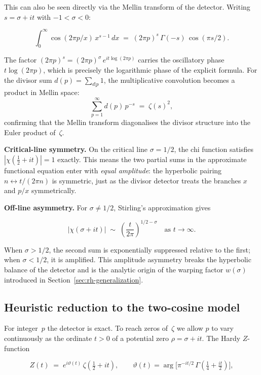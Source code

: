 \documentclass[12pt,a4paper]{article}
\begin{document}
This can also be seen directly via the Mellin transform of the detector. Writing $s = \sigma + it$ with $-1 < \sigma < 0$:

\begin{mathblock}
\[
\int_0^{\infty} \cos(2\pi p/x)\,x^{s-1}\,dx \;=\; (2\pi p)^{s}\,\Gamma(-s)\,\cos(\pi s/2).
\]
\end{mathblock}

\noindent The factor $(2\pi p)^s = (2\pi p)^{\sigma}\,e^{it\log(2\pi p)}$ carries the oscillatory phase $t\log(2\pi p)$, which is precisely the logarithmic phase of the explicit formula. For the divisor sum $d(p) = \sum_{d|p}1$, the multiplicative convolution becomes a product in Mellin space:
\[
\sum_{p=1}^{\infty} d(p)\,p^{-s} \;=\; \zeta(s)^{2},
\]
confirming that the Mellin transform diagonalises the divisor structure into the Euler product of~$\zeta$.

\textbf{Critical-line symmetry.} On the critical line $\sigma = 1/2$, the chi function satisfies $|\chi(\tfrac12+it)|=1$ exactly. This means the two partial sums in the approximate functional equation enter with \emph{equal amplitude}: the hyperbolic pairing $n \leftrightarrow t/(2\pi n)$ is symmetric, just as the divisor detector treats the branches $x$ and $p/x$ symmetrically.

\textbf{Off-line asymmetry.} For $\sigma \neq 1/2$, Stirling's approximation gives

\begin{mathblock}
\[
|\chi(\sigma+it)| \;\sim\; \left(\frac{t}{2\pi}\right)^{1/2-\sigma} \quad \text{as } t \to \infty.
\]
\end{mathblock}

\noindent When $\sigma > 1/2$, the second sum is exponentially suppressed relative to the first; when $\sigma < 1/2$, it is amplified. This amplitude asymmetry breaks the hyperbolic balance of the detector and is the analytic origin of the warping factor $w(\sigma)$ introduced in Section~\ref{sec:rh-generalization}.

\subsection{Heuristic reduction to the two-cosine model}

For integer~$p$ the detector is exact. To reach zeros of~$\zeta$ we allow $p$ to vary continuously as the ordinate $t > 0$ of a potential zero $\rho = \sigma + it$. The Hardy $Z$-function
\begin{mathblock}
\[
Z(t) \;=\; e^{i\vartheta(t)}\,\zeta(\tfrac12 + it), \qquad \vartheta(t) = \arg\!\bigl[\pi^{-it/2}\,\Gamma(\tfrac14 + \tfrac{it}{2})\bigr],
\]
\end{mathblock}
\end{document}
